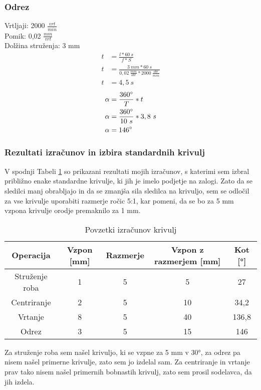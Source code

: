 \subsubsection{Odrez}
\label{izracun_odreza}
Vrtljaji: 2000 \( \frac{vrt}{min} \) \\
Pomik: 0,02 \( \frac{mm}{vrt} \) \\
Dolžina struženja: 3 mm
\begin{equation}
	\begin{split}
		t &= \frac{l*60\ s}{f*S} \\
		t &= \frac{3\ mm*60\ s}{0,02\ \frac{mm}{obr}*2000\ \frac{obr}{min}} \\
		t &= 4,5\ s
	\end{split}
\end{equation}
\begin{equation}
	\begin{split}
		\alpha &= \frac{360\degree}{T} * t \\
		\alpha &= \frac{360\degree}{10\ s} * 3,8\ s\\
		\alpha &= 146\degree
	\end{split}
\end{equation}

\subsubsection{Rezultati izračunov in izbira standardnih krivulj}
V spodnji Tabeli \ref{Tabela rezultatov} so prikazani
rezultati mojih izračunov, s katerimi sem izbral približno
enake standardne krivulje, ki jih je imelo podjetje na zalogi.
Zato da se sledilci manj obrabljajo in da se zmanjša sila sledilca
na krivuljo, sem se odločil za vse krivulje uporabiti razmerje ročic
5:1, kar pomeni, da se bo za 5 mm vzpona krivulje orodje premaknilo za 1 mm.

\begin{table}[H]
	\caption{Povzetki izračunov krivulj}
	\label{Tabela rezultatov}
	\begin{center}
		\begin{tabular}{|c|c|c|c|c|}
			\hline
			Operacija      & Vzpon [mm] & Razmerje & Vzpon z razmerjem [mm] & Kot [°] \\
			\hline
			Struženje roba & 1          & 5        & 5                      & 27      \\
			\hline
			Centriranje    & 2          & 5        & 10                     & 34,2    \\
			\hline
			Vrtanje        & 8          & 5        & 40                     & 136,8   \\
			\hline
			Odrez          & 3          & 5        & 15                     & 146     \\
			\hline
		\end{tabular}
	\end{center}
\end{table}

Za struženje roba sem našel krivuljo, ki se vzpne za 5 mm v 30°,
za odrez pa nisem našel primerne krivulje, zato sem jo izdelal sam.
Za centriranje in vrtanje prav tako nisem našel primernih bobnastih krivulj,
zato sem prosil sodelavca, da jih izdela.